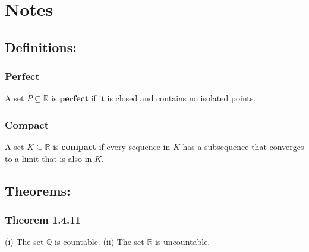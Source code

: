 \documentclass{article}
\begin{document}
\section*{Notes}
\subsection*{\textbf{Definitions:}}
\subsubsection*{Perfect}
A set $P \subseteq \mathbb{R}$ is $\textbf{perfect}$ if it is closed and contains no isolated points.
\subsubsection*{Compact}
A set $K \subseteq \mathbb{R}$ is \textbf{compact} if every sequence in $K$ has a subsequence that converges to a limit that is also in $K$.

\subsection*{\textbf{Theorems:}}
\subsubsection*{Theorem 1.4.11}
(i) The set $\mathbb{Q}$ is countable. (ii) The set $\mathbb{R}$ is uncountable.
\end{document}
